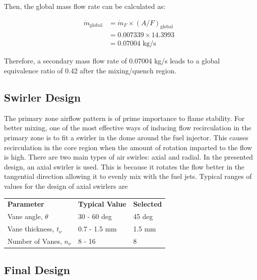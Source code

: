 Then, the global mass flow rate can be calculated as:



\begin{equation}
\begin{split}
        \dot{m}_{\text{global}} & = \dot{m}_{F} \times  \left( A/F \right)_{\text{global}} \\
        & = 0.007339 \times 14.3993 \\
        & = 0.07004 \text{ kg/s}
\end{split}
\end{equation}

Therefore, a secondary mass flow rate of 0.07004 kg/s leads to a global equivalence ratio of 0.42 after the mixing/quench region.

\subsection{Swirler Design}

The primary zone airflow pattern is of prime importance to flame stability. For better mixing, one of the most effective ways of inducing flow recirculation in the primary zone is to fit a swirler in the dome around the fuel injector. This causes recirculation in the core region when the amount of rotation imparted to the flow is high. There are two main types of air swirles: axial and radial. In the presented design, an axial swirler is used. This is because it rotates the flow better in the tangential direction allowing it to evenly mix with the fuel jets. Typical ranges of values for the design of axial swirlers are \cite{dodds1990combustion, knight1953component}

\begin{table}[H]
    \centering
    \begin{tabular}{lll}
        \textbf{Parameter} & \textbf{Typical Value} & \textbf{Selected} \\
         Vane angle, $\theta$ &  30 - 60 deg & 45 deg \\
         Vane thickness, $t_{\nu}$ & 0.7 - 1.5 mm & 1.5 mm \\
         Number of Vanes, $n_{\nu}$ & 8 - 16 & 8
    \end{tabular}
\end{table}

\subsection{Final Design}

